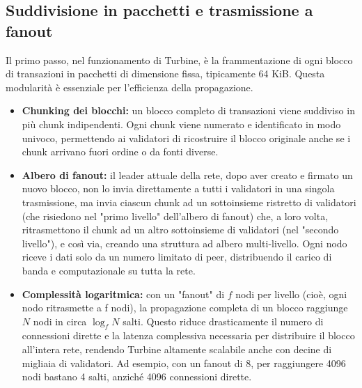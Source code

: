 \documentclass[a4paper,12pt]{report}
\begin{document}
	\subsection{Suddivisione in pacchetti e trasmissione a fanout}
	Il primo passo, nel funzionamento di Turbine, è la frammentazione di ogni blocco di transazioni in pacchetti di dimensione fissa, tipicamente 64 KiB. Questa modularità è essenziale per l'efficienza della propagazione.  
	\begin{itemize}
		\item \textbf{Chunking dei blocchi:} un blocco completo di transazioni viene suddiviso in più chunk indipendenti. Ogni chunk viene numerato e identificato in modo univoco, permettendo ai validatori di ricostruire il blocco originale anche se i chunk arrivano fuori ordine o da fonti diverse.
		\item \textbf{Albero di fanout:} il leader attuale della rete, dopo aver creato e firmato un nuovo blocco, non lo invia direttamente a tutti i validatori in una singola trasmissione, ma invia ciascun chunk ad un sottoinsieme ristretto di validatori (che risiedono nel "primo livello" dell'albero di fanout) che, a loro volta, ritrasmettono il chunk ad un altro sottoinsieme di validatori (nel "secondo livello"), e così via, creando una struttura ad albero multi-livello. Ogni nodo riceve i dati solo da un numero limitato di peer, distribuendo il carico di banda e computazionale su tutta la rete.
		\item \textbf{Complessità logaritmica:} con un "fanout" di \(f\) nodi per livello (cioè, ogni nodo ritrasmette a f nodi), la propagazione completa di un blocco raggiunge \(N\) nodi in circa \(\log_f N\) salti. Questo riduce drasticamente il numero di connessioni dirette e la latenza complessiva necessaria per distribuire il blocco all'intera rete, rendendo Turbine altamente scalabile anche con decine di migliaia di validatori. Ad esempio, con un fanout di 8, per raggiungere 4096 nodi bastano 4 salti, anziché 4096 connessioni dirette.
	\end{itemize}
	
\end{document}

